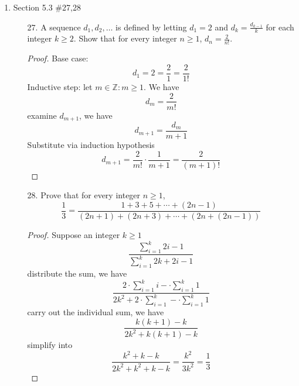 \documentclass[12pt]{article}
\newcommand{\Z}{\mathbb{Z}}
\newcommand{\paren}[1]{\left( #1 \right)}
\begin{document}
\begin{enumerate}
\begin{enumerate}
        \end{enumerate}

    \newpage

    \item Section 5.3 \#27,28
        \begin{enumerate}
            \item[27.] A sequence $d_1,d_2,\ldots$ is defined by letting $d_1=2$ and $d_k = \frac{d_{k-1}}{k}$ for each integer $k \geq 2 $. Show that for every integer $n\geq 1$, $d_n = \frac{2}{n!}$.
                \begin{proof}
                    Base case: 
                    \[
                    d_1 = 2 = \frac{2}{1} = \frac{2}{1!}
                    \]
                    Inductive step: let $m \in \Z : m \geq 1$. We have
                    \[
                    d_m = \frac{2}{m!}
                    \]
                    examine $d_{m+1}$, we have
                    \[
                    d_{m+1} = \frac{d_m}{m+1}
                    \]
                    Substitute via induction hypothesis
                    \[
                    d_{m+1} = \frac{2}{m!} \cdot \frac{1}{m+1} = \frac{2}{\paren{m+1}!}
                    \]

                \end{proof}
            \item[28.] Prove that for every integer $n \geq 1$,
                \[
                \frac{1}{3} = \frac{1+3+5 + \cdots + \paren{2n-1}}{\paren{2n+1}+\paren{2n+3}+\cdots + \paren{2n + \paren{2n-1}}}
                \]
                \begin{proof}
                    Suppose an integer $k \geq 1$
                        \[
                        \frac{\sum_{i=1}^{k}2i-1}{ \sum_{i=1}^{k}2k +2i-1} 
                        \]
                    distribute the sum, we have
                        \[
                        \frac{2\cdot \sum_{i=1}^{k}i - \cdot \sum_{i=1}^{k}1 }{2k^2 + 2 \cdot \sum_{i=1}^{k} - \cdot \sum_{i=1}^{k}1}
                        \]
                    carry out the individual sum, we have
                        \[
                        \frac{k\paren{k+1}-k}{2k^2 + k\paren{k+1}-k}
                        \]
                    simplify into
                        \[
                        \frac{k^2+k-k}{2k^2 + k^2 + k -k} = \frac{k^2}{3k^2} = \frac{1}{3}
                        \]
 
                \end{proof}
                

\end{enumerate}
\end{enumerate}
\end{document}
